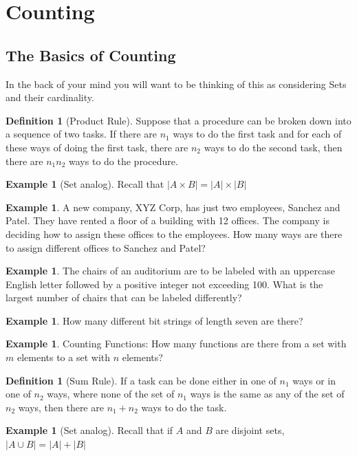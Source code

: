 \documentclass[letterpaper,10pt]{article}
\theoremstyle{plain}
\theoremstyle{definition}
\newtheorem{defn}[thm]{Definition}
\newtheorem{exmp}[thm]{Example}
\theoremstyle{remark}
\begin{document}
\section{Counting}
\subsection{The Basics of Counting}
 In the back of your mind you will want to be thinking of this as considering Sets and their cardinality.

\begin{defn}[Product Rule]
    Suppose that a procedure can be broken down into a sequence of two tasks. If there are $n_1$ ways to do the first task and for each of these ways of doing the first task, there are $n_2$ ways to do the second task, then there are $n_1 n_2$ ways to do the procedure.
\end{defn}
\begin{exmp}[Set analog] Recall that $|A\times B|=|A|\times |B|$
\end{exmp}
\begin{exmp}
    A new company, XYZ Corp, has just two employees, Sanchez and Patel. They have rented a floor of a building with 12 offices. The company is deciding how to assign these offices to the employees. How many ways are there to assign different offices to Sanchez and Patel?
    
    \vspace{2cm}
\end{exmp}
\begin{exmp}
    The chairs of an auditorium are to be labeled with an uppercase English letter followed by a positive integer not exceeding 100. What is the largest number of chairs that can be labeled differently?
    \vspace{2cm}
\end{exmp}
\begin{exmp}
    How many different bit strings of length seven are there?
    \vspace{2cm}
\end{exmp}
\begin{exmp}
    Counting Functions: How many functions are there from a set with $m$ elements to a set with $n$ elements?
    \vspace{2cm}
\end{exmp}
\begin{defn}[Sum Rule]
    If a task can be done either in one of $n_1$ ways or in one of $n_2$ ways, where none of the set of $n_1$ ways is the same as any of the set of $n_2$ ways, then there are $n_1 + n_2$ ways to do the task.
\end{defn}
\begin{exmp}[Set analog] Recall that if $A$ and $B$ are disjoint sets,  $|A\cup B|=|A|+|B|$
\end{exmp}
\end{document}
